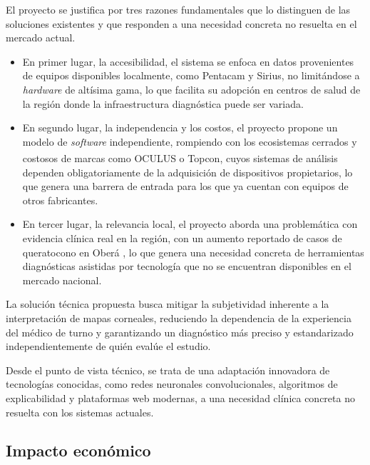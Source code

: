     El proyecto se justifica por tres razones fundamentales que lo distinguen de las soluciones existentes y que responden a una necesidad concreta no resuelta en el mercado actual.

    \begin{itemize}
        \item En primer lugar, la accesibilidad, el sistema se enfoca en datos provenientes de equipos disponibles localmente, como Pentacam y Sirius, no limitándose a \textit{hardware} de altísima gama, lo que facilita su adopción en centros de salud de la región donde la infraestructura diagnóstica puede ser variada.
    
        \item En segundo lugar, la independencia y los costos, el proyecto propone un modelo de \textit{software} independiente, rompiendo con los ecosistemas cerrados y costosos de marcas como OCULUS\textsuperscript{\textregistered} o Topcon\textsuperscript{\textregistered}, cuyos sistemas de análisis dependen obligatoriamente de la adquisición de dispositivos propietarios, lo que genera una barrera de entrada para los que ya cuentan con equipos de otros fabricantes.
    
        \item En tercer lugar, la relevancia local, el proyecto aborda una problemática con evidencia clínica real en la región, con un aumento reportado de casos de queratocono en Oberá , lo que genera una necesidad concreta de herramientas diagnósticas asistidas por tecnología que no se encuentran disponibles en el mercado nacional.
    \end{itemize}
    
    La solución técnica propuesta busca mitigar la subjetividad inherente a la interpretación de mapas corneales, reduciendo la dependencia de la experiencia del médico de turno y garantizando un diagnóstico más preciso y estandarizado independientemente de quién evalúe el estudio.
    
    Desde el punto de vista técnico, se trata de una adaptación innovadora de tecnologías conocidas, como redes neuronales convolucionales, algoritmos de explicabilidad y plataformas web modernas, a una necesidad clínica concreta no resuelta con los sistemas actuales.

    \subsection*{Impacto económico}

